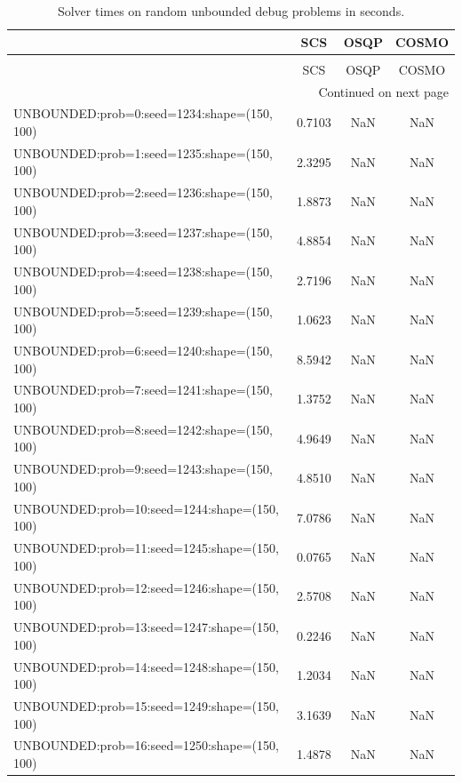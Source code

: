 \begin{longtable}{lccc}
\caption{Solver times on random unbounded debug problems in seconds.}
\label{t-random unbounded debug-results}\\
\toprule
{} &     SCS &  OSQP &  COSMO \\
\midrule
\endfirsthead
\caption[]{Solver times on random unbounded debug problems in seconds.} \\
\toprule
{} &     SCS &  OSQP &  COSMO \\
\midrule
\endhead
\midrule
\multicolumn{4}{r}{{Continued on next page}} \\
\midrule
\endfoot

\bottomrule
\endlastfoot
UNBOUNDED:prob=0:seed=1234:shape=(150, 100)   &  0.7103 &   NaN &    NaN \\
UNBOUNDED:prob=1:seed=1235:shape=(150, 100)   &  2.3295 &   NaN &    NaN \\
UNBOUNDED:prob=2:seed=1236:shape=(150, 100)   &  1.8873 &   NaN &    NaN \\
UNBOUNDED:prob=3:seed=1237:shape=(150, 100)   &  4.8854 &   NaN &    NaN \\
UNBOUNDED:prob=4:seed=1238:shape=(150, 100)   &  2.7196 &   NaN &    NaN \\
UNBOUNDED:prob=5:seed=1239:shape=(150, 100)   &  1.0623 &   NaN &    NaN \\
UNBOUNDED:prob=6:seed=1240:shape=(150, 100)   &  8.5942 &   NaN &    NaN \\
UNBOUNDED:prob=7:seed=1241:shape=(150, 100)   &  1.3752 &   NaN &    NaN \\
UNBOUNDED:prob=8:seed=1242:shape=(150, 100)   &  4.9649 &   NaN &    NaN \\
UNBOUNDED:prob=9:seed=1243:shape=(150, 100)   &  4.8510 &   NaN &    NaN \\
UNBOUNDED:prob=10:seed=1244:shape=(150, 100)  &  7.0786 &   NaN &    NaN \\
UNBOUNDED:prob=11:seed=1245:shape=(150, 100)  &  0.0765 &   NaN &    NaN \\
UNBOUNDED:prob=12:seed=1246:shape=(150, 100)  &  2.5708 &   NaN &    NaN \\
UNBOUNDED:prob=13:seed=1247:shape=(150, 100)  &  0.2246 &   NaN &    NaN \\
UNBOUNDED:prob=14:seed=1248:shape=(150, 100)  &  1.2034 &   NaN &    NaN \\
UNBOUNDED:prob=15:seed=1249:shape=(150, 100)  &  3.1639 &   NaN &    NaN \\
UNBOUNDED:prob=16:seed=1250:shape=(150, 100)  &  1.4878 &   NaN &    NaN \\

\end{longtable}
